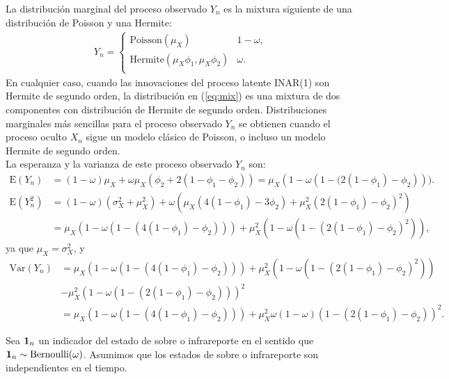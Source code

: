 \documentclass[12pt,twoside]{article} %
\begin{document}
\medskip

\noindent La distribución marginal del proceso observado $Y_n$ es la mixtura siguiente de una distribución de Poisson y una Hermite:
\begin{align}\label{eq:mix}
Y_n=\begin{cases} 
\textrm{Poisson}(\mu_X) &  1-\omega, \\
\textrm{Hermite}\left(\mu_X\phi_1,\mu_X\phi_2\right) &  \omega. \\
\end{cases}
\end{align}
En cualquier caso, cuando las innovaciones del proceso latente INAR(1) son Hermite de segundo orden, la distribución en (\ref{eq:mix}) es una mixtura de dos componentes con distribución de Hermite de segundo orden. Distribuciones marginales más sencillas para el proceso observado $Y_n$ se obtienen cuando el proceso oculto $X_n$ sigue un modelo clásico de Poisson, o incluso un modelo Hermite de segundo orden.\\ 
La esperanza y la varianza de este proceso observado $Y_n$ son:
\begin{align*}
\textrm{E}(Y_n)&=(1-\omega)\mu_X+\omega\mu_X\left(\phi_2+2(1-\phi_1-\phi_2)\right)=\mu_X(1-\omega\left(1-(2(1-\phi_1)-\phi_2\right))).\\
\textrm{E}(Y_n^2)&=(1-\omega)(\sigma_X^2+\mu_X^2)+\omega \left(\mu_X(4(1-\phi_1)-3\phi_2)+\mu_X^2(2(1-\phi_1)-\phi_2)^2\right)\\&=\mu_X\left(1-\omega\left(1-\left(4(1-\phi_1)-\phi_2\right)\right)\right)+\mu_X^2\left(1-\omega\left(1-(2(1-\phi_1)-\phi_2)^2\right)\right),
\end{align*}
ya que $\mu_X=\sigma_X^2$, y 
\begin{align*}
\textrm{Var}(Y_n)&=\mu_X\left(1-\omega\left(1-\left(4\left(1-\phi_1\right)-\phi_2\right)\right)\right)+\mu_X^2\left(1-\omega\left(1-\left(2\left(1-\phi_1\right)-\phi_2\right)^2\right)\right)\\ &-\mu_X^2\left(1-\omega\left(1-\left(2\left(1-\phi_1\right)-\phi_2\right)\right)\right)^2\\&=\mu_X\left(1-\omega\left(1-\left(4\left(1-\phi_1\right)-\phi_2\right)\right)\right)+\mu_X^2\omega(1-\omega)\left(1-\left(2\left(1-\phi_1\right)-\phi_2\right)\right)^2. 
\end{align*}

\noindent Sea ${\bf 1}_n$ un indicador del estado de sobre o infrareporte en el sentido que ${\bf 1}_n \sim \textrm{Bernoulli}(\omega)$. Asumimos que los estados de sobre o infrareporte son independientes en el tiempo. 
\end{document}
